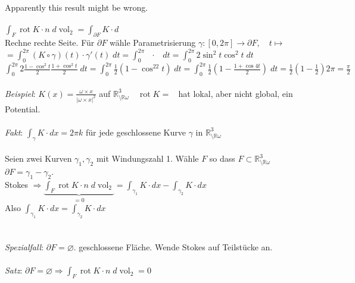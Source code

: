 \documentclass[12pt,a4paper,titlepage]{article}
\renewcommand{\d}{\partial}
\newcommand{\setR}{\mathbb{R}}
\newcommand{\vol}{\operatorname{vol}}
\newcommand{\rot}{\operatorname{rot}}
\newcommand{\threevec}[3]{\mathop{\left(\substack{#1 \\ #2 \\ #3}\right)}}
\begin{document}
Apparently this result might be wrong. \\
\\
$\int_F\rot K\cdot n\;d\vol_2=\int_{\d F}K\cdot d\threevec{x}{y}{z}$ \\
Rechne rechte Seite. Für $\d F$ wähle Parametrisierung $\gamma:[0,2\pi]\to\d F, \quad t\mapsto\threevec{\cos t}{\sin t}{0}$ \\
$=\int_0^{2\pi}(K\circ\gamma)(t)\cdot\gamma'(t)\;dt=\int_0^{2\pi}\threevec{-\sin t\cos^2t}{\cos t\sin^2t}{0}\cdot\threevec{-\sin t}{\cos t}{0} \;dt = \int_0^{2\pi}2\sin^2t\cos^2t \;dt$ \\
$\int_0^{2\pi}2\frac{1-\cos^2t}{2}\frac{1+\cos^2t}{2} \;dt=\int_0^{2\pi}\frac{1}{2}(1-\cos^22t) \;dt = \int_0^{2\pi}\frac{1}{2}(1-\frac{1+\cos4t}{2}) \;dt = \frac{1}{2}(1-\frac{1}{2})2\pi=\frac{\pi}{2}$ \\
\\
\textit{Beispiel}: $K(x)=\frac{\omega\times x}{|\omega\times x|^2}$ auf $\setR^3_{\setminus\setR\omega} \quad \rot K=\threevec{0}{0}{0}$ hat lokal, aber nicht global, ein Potential. \\
\\
\textit{Fakt}: $\int_\gamma K\cdot dx=2\pi k$ für jede geschlossene Kurve $\gamma$ in $\setR^3_{\setminus\setR\omega}$ \\
\\
Seien zwei Kurven $\gamma_1,\gamma_2$ mit Windungszahl 1. Wähle $F$ so dass $F\subset\setR^3_{\setminus\setR\omega}$ \quad $\d F=\gamma_1-\gamma_2$. \\
Stokes $\Rightarrow \underbrace{\int_F\rot K\cdot n \;d\vol_2}_{=0} = \int_{\gamma_1}K\cdot dx-\int_{\gamma_2}K\cdot dx$ \\
Also $\int_{\gamma_1}K\cdot dx = \int_{\gamma_2}K\cdot dx$ \\
\\
\\
\textit{Spezialfall}: $\d F=\varnothing$. geschlossene Fläche. Wende Stokes auf Teilstücke an. \\
\\
\textit{Satz}: $\d F=\varnothing \Rightarrow \int_F\rot K\cdot n \;d\vol_2=0$
\end{document}
